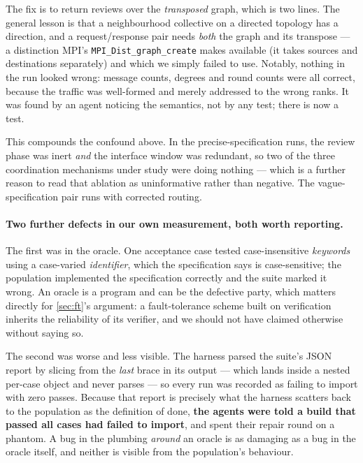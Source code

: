 \documentclass[10pt,twocolumn]{article}
\theoremstyle{definition}
\theoremstyle{plain}
\newcommand{\code}[1]{\texttt{\small #1}}
\begin{document}
The fix is to return reviews over the \emph{transposed} graph, which is two lines. The
general lesson is that a neighbourhood collective on a directed topology has a
direction, and a request/response pair needs \emph{both} the graph and its transpose ---
a distinction MPI's \code{MPI\_Dist\_graph\_create} makes available (it takes sources
and destinations separately) and which we simply failed to use. Notably, nothing in the
run looked wrong: message counts, degrees and round counts were all correct, because
the traffic was well-formed and merely addressed to the wrong ranks. It was found by an
agent noticing the semantics, not by any test; there is now a test.

This compounds the confound above. In the precise-specification runs, the review phase
was inert \emph{and} the interface window was redundant, so two of the three
coordination mechanisms under study were doing nothing --- which is a further reason to
read that ablation as uninformative rather than negative. The vague-specification pair
runs with corrected routing.

\paragraph{Two further defects in our own measurement, both worth reporting.} The first was
in the oracle. One acceptance case tested case-insensitive \emph{keywords} using a
case-varied \emph{identifier}, which the specification says is case-sensitive; the
population implemented the specification correctly and the suite marked it wrong. An
oracle is a program and can be the defective party, which matters directly for
\cref{sec:ft}'s argument: a fault-tolerance scheme built on verification inherits the
reliability of its verifier, and we should not have claimed otherwise without saying
so.

The second was worse and less visible. The harness parsed the suite's JSON report by
slicing from the \emph{last} brace in its output --- which lands inside a nested
per-case object and never parses --- so every run was recorded as failing to import
with zero passes. Because that report is precisely what the harness scatters back to
the population as the definition of done, \textbf{the agents were told a build that
passed all \NAcceptanceCases{} cases had failed to import}, and spent their repair round on a
phantom. A bug in the plumbing \emph{around} an oracle is as damaging as a bug in the
oracle itself, and neither is visible from the population's behaviour.
\end{document}
